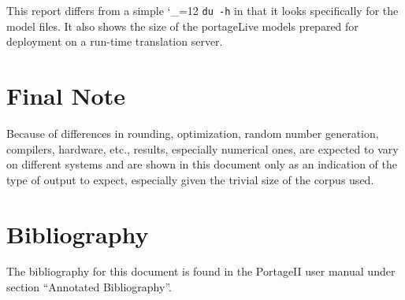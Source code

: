 \documentclass[11pt,letterpaper]{article}
\newcommand{\PS}{PortageII\xspace}
\def\code{\begingroup\catcode`\_=12 \codex}
\newcommand{\codex}[1]{\texttt{#1}\endgroup}
\begin{document}
This report differs from a simple \code{du -h} in that it looks specifically
for the model files. It also shows the size of the portageLive models prepared
for deployment on a run-time translation server.

\section*{Final Note}
Because of differences in rounding, optimization, random number generation,
compilers, hardware, etc., results, especially numerical ones, are expected to
vary on different systems and are shown in this document only as an indication
of the type of output to expect, especially given the trivial size of the
corpus used.

\section*{Bibliography}
The bibliography for this document is found in the \PS user manual under
section ``Annotated Bibliography''.
\end{document}
